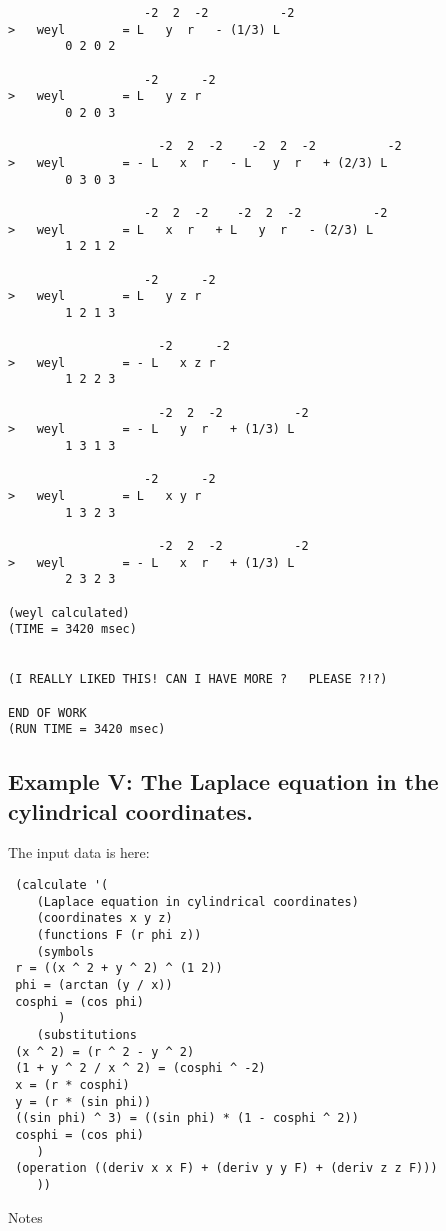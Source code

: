 \begin{verbatim}
                   -2  2  -2          -2
>   weyl        = L   y  r   - (1/3) L
        0 2 0 2

                   -2      -2
>   weyl        = L   y z r
        0 2 0 3

                     -2  2  -2    -2  2  -2          -2
>   weyl        = - L   x  r   - L   y  r   + (2/3) L
        0 3 0 3

                   -2  2  -2    -2  2  -2          -2
>   weyl        = L   x  r   + L   y  r   - (2/3) L
        1 2 1 2

                   -2      -2
>   weyl        = L   y z r
        1 2 1 3

                     -2      -2
>   weyl        = - L   x z r
        1 2 2 3

                     -2  2  -2          -2
>   weyl        = - L   y  r   + (1/3) L
        1 3 1 3

                   -2      -2
>   weyl        = L   x y r
        1 3 2 3

                     -2  2  -2          -2
>   weyl        = - L   x  r   + (1/3) L
        2 3 2 3

(weyl calculated)
(TIME = 3420 msec)


(I REALLY LIKED THIS! CAN I HAVE MORE ?   PLEASE ?!?)

END OF WORK
(RUN TIME = 3420 msec)
\end{verbatim}

\subsection{Example V: The Laplace equation in the cylindrical coordinates.}

The input data is here:

\bigskip

\begin{verbatim}
 (calculate '(
    (Laplace equation in cylindrical coordinates)
    (coordinates x y z)
    (functions F (r phi z))
    (symbols
 r = ((x ^ 2 + y ^ 2) ^ (1 2))
 phi = (arctan (y / x))
 cosphi = (cos phi)
       )
    (substitutions
 (x ^ 2) = (r ^ 2 - y ^ 2)
 (1 + y ^ 2 / x ^ 2) = (cosphi ^ -2)
 x = (r * cosphi)
 y = (r * (sin phi))
 ((sin phi) ^ 3) = ((sin phi) * (1 - cosphi ^ 2))
 cosphi = (cos phi)
    )
 (operation ((deriv x x F) + (deriv y y F) + (deriv z z F)))
    ))
\end{verbatim}

\bigskip

\centerline{Notes}

